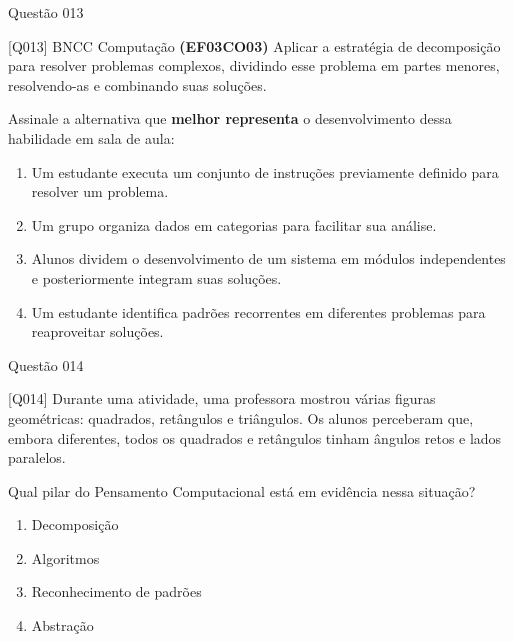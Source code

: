 \documentclass[xcolor=dvipsnames,table]{beamer}
\begin{document}
	\begin{frame}{Questão 013}
		\begin{block}{[Q013] BNCC Computação}
		 {\bf (EF03CO03)} Aplicar a estratégia de decomposição para resolver problemas complexos, dividindo esse problema em partes menores, resolvendo-as e combinando suas soluções.

        Assinale a alternativa que {\bf melhor representa} o desenvolvimento dessa habilidade em sala de aula: 
		\end{block}
		\begin{enumerate}[label=(\Alph*)]
			\item Um estudante executa um conjunto de instruções previamente definido para resolver um problema.
			\item Um grupo organiza dados em categorias para facilitar sua análise.
			\item Alunos dividem o desenvolvimento de um sistema em módulos independentes e posteriormente integram suas soluções.
			\item Um estudante identifica padrões recorrentes em diferentes problemas para reaproveitar soluções.
		\end{enumerate}
	\end{frame}

        \begin{frame}{Questão 014}
		\begin{block}{[Q014]}
		 Durante uma atividade, uma professora mostrou várias figuras geométricas: quadrados, retângulos e triângulos. Os alunos perceberam que, embora diferentes, todos os quadrados e retângulos tinham ângulos retos e lados paralelos.

Qual pilar do Pensamento Computacional está em evidência nessa situação? 
		\end{block}
		\begin{enumerate}[label=(\Alph*)]
			\item Decomposição
                \item Algoritmos
                \item Reconhecimento de padrões
                \item Abstração
		\end{enumerate}
	\end{frame}
\end{document}
